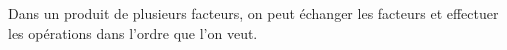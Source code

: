 Dans un produit de plusieurs facteurs, on peut échanger les facteurs et
effectuer les opérations dans l'ordre que l'on veut.
